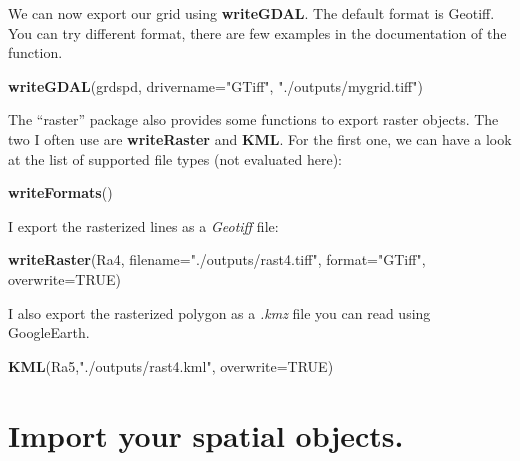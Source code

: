 \documentclass[]{report}
\newenvironment{Shaded}{\begin{snugshade}}{\end{snugshade}}
\newcommand{\KeywordTok}[1]{\textcolor[rgb]{0.13,0.29,0.53}{\textbf{{#1}}}}
\newcommand{\DataTypeTok}[1]{\textcolor[rgb]{0.13,0.29,0.53}{{#1}}}
\newcommand{\StringTok}[1]{\textcolor[rgb]{0.31,0.60,0.02}{{#1}}}
\newcommand{\OtherTok}[1]{\textcolor[rgb]{0.56,0.35,0.01}{{#1}}}
\newcommand{\NormalTok}[1]{{#1}}
\begin{document}
We can now export our grid using \textbf{writeGDAL}. The default format
is Geotiff. You can try different format, there are few examples in the
documentation of the function.

\begin{Shaded}
\begin{Highlighting}[]
\KeywordTok{writeGDAL}\NormalTok{(grdspd, }\DataTypeTok{drivername=}\StringTok{"GTiff"}\NormalTok{, }\StringTok{"./outputs/mygrid.tiff"}\NormalTok{)}
\end{Highlighting}
\end{Shaded}

The ``raster'' package also provides some functions to export raster
objects. The two I often use are \textbf{writeRaster} and \textbf{KML}.
For the first one, we can have a look at the list of supported file
types (not evaluated here):

\begin{Shaded}
\begin{Highlighting}[]
\KeywordTok{writeFormats}\NormalTok{()}
\end{Highlighting}
\end{Shaded}

I export the rasterized lines as a \emph{Geotiff} file:

\begin{Shaded}
\begin{Highlighting}[]
\KeywordTok{writeRaster}\NormalTok{(Ra4, }\DataTypeTok{filename=}\StringTok{"./outputs/rast4.tiff"}\NormalTok{, }\DataTypeTok{format=}\StringTok{"GTiff"}\NormalTok{, }\DataTypeTok{overwrite=}\OtherTok{TRUE}\NormalTok{)}
\end{Highlighting}
\end{Shaded}

I also export the rasterized polygon as a \emph{.kmz} file you can read
using GoogleEarth.

\begin{Shaded}
\begin{Highlighting}[]
\KeywordTok{KML}\NormalTok{(Ra5,}\StringTok{"./outputs/rast4.kml"}\NormalTok{, }\DataTypeTok{overwrite=}\OtherTok{TRUE}\NormalTok{)}
\end{Highlighting}
\end{Shaded}

\section{Import your spatial
objects.}\label{import-your-spatial-objects.}
\end{document}
